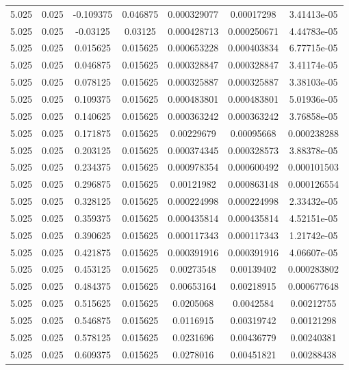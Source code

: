 \begin{table}[bh]
\begin{center}
{\begin{tabular}{ccccccc}
5.025	 & 0.025 & 	-0.109375	 & 0.046875	 & 0.000329077	 & 0.00017298	 & 3.41413e-05 \\ 
5.025	 & 0.025 & 	-0.03125	 & 0.03125	 & 0.000428713	 & 0.000250671	 & 4.44783e-05 \\ 
5.025	 & 0.025 & 	0.015625	 & 0.015625	 & 0.000653228	 & 0.000403834	 & 6.77715e-05 \\ 
5.025	 & 0.025 & 	0.046875	 & 0.015625	 & 0.000328847	 & 0.000328847	 & 3.41174e-05 \\ 
5.025	 & 0.025 & 	0.078125	 & 0.015625	 & 0.000325887	 & 0.000325887	 & 3.38103e-05 \\ 
5.025	 & 0.025 & 	0.109375	 & 0.015625	 & 0.000483801	 & 0.000483801	 & 5.01936e-05 \\ 
5.025	 & 0.025 & 	0.140625	 & 0.015625	 & 0.000363242	 & 0.000363242	 & 3.76858e-05 \\ 
5.025	 & 0.025 & 	0.171875	 & 0.015625	 & 0.00229679	 & 0.00095668	 & 0.000238288 \\ 
5.025	 & 0.025 & 	0.203125	 & 0.015625	 & 0.000374345	 & 0.000328573	 & 3.88378e-05 \\ 
5.025	 & 0.025 & 	0.234375	 & 0.015625	 & 0.000978354	 & 0.000600492	 & 0.000101503 \\ 
5.025	 & 0.025 & 	0.296875	 & 0.015625	 & 0.00121982	 & 0.000863148	 & 0.000126554 \\ 
5.025	 & 0.025 & 	0.328125	 & 0.015625	 & 0.000224998	 & 0.000224998	 & 2.33432e-05 \\ 
5.025	 & 0.025 & 	0.359375	 & 0.015625	 & 0.000435814	 & 0.000435814	 & 4.52151e-05 \\ 
5.025	 & 0.025 & 	0.390625	 & 0.015625	 & 0.000117343	 & 0.000117343	 & 1.21742e-05 \\ 
5.025	 & 0.025 & 	0.421875	 & 0.015625	 & 0.000391916	 & 0.000391916	 & 4.06607e-05 \\ 
5.025	 & 0.025 & 	0.453125	 & 0.015625	 & 0.00273548	 & 0.00139402	 & 0.000283802 \\ 
5.025	 & 0.025 & 	0.484375	 & 0.015625	 & 0.00653164	 & 0.00218915	 & 0.000677648 \\ 
5.025	 & 0.025 & 	0.515625	 & 0.015625	 & 0.0205068	 & 0.0042584	 & 0.00212755 \\ 
5.025	 & 0.025 & 	0.546875	 & 0.015625	 & 0.0116915	 & 0.00319742	 & 0.00121298 \\ 
5.025	 & 0.025 & 	0.578125	 & 0.015625	 & 0.0231696	 & 0.00436779	 & 0.00240381 \\ 
5.025	 & 0.025 & 	0.609375	 & 0.015625	 & 0.0278016	 & 0.00451821	 & 0.00288438 \\ 

\end{tabular}}
\end{center}
\end{table}
